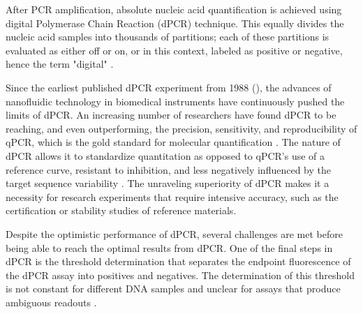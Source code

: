 After PCR amplification, absolute nucleic acid quantification is achieved using digital Polymerase Chain Reaction (dPCR) technique. This equally divides the nucleic acid samples into thousands of partitions; each of these partitions is evaluated as either off or on, or in this context, labeled as positive or negative, hence the term "digital" \cite{Cao2017}.

Since the earliest published dPCR experiment from 1988 (\citeauthor{Saiki1988}), the advances of nanofluidic technology in biomedical instruments have continuously pushed the limits of dPCR. An increasing number of researchers have found dPCR to be reaching, and even outperforming, the precision, sensitivity, and reproducibility of qPCR, which is the gold standard for molecular quantification \cite{Chen2018, Persson2018, Taylor2017, Arvia2017, Blaya2016, Jones2016, Sanders2011}. The nature of dPCR allows it to standardize quantitation as opposed to qPCR's use of a reference curve, resistant to inhibition, and less negatively influenced by the target sequence variability \cite{Sedlak2014}. The unraveling superiority of dPCR makes it a necessity for research experiments that require intensive accuracy, such as the certification or stability studies of reference materials.



Despite the optimistic performance of dPCR, several challenges are met before being able to reach the optimal results from dPCR. One of the final steps in dPCR is the threshold determination that separates the endpoint fluorescence of the dPCR assay into positives and negatives. The determination of this threshold is not constant for different DNA samples and unclear for assays that produce ambiguous readouts \cite{Trypsteen2015}.

